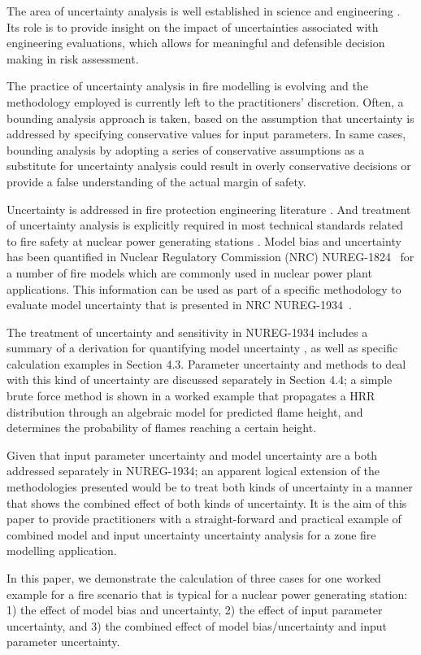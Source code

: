 
The area of uncertainty analysis is well established in science and engineering \cite{Morgan}.  Its role is to provide insight on the impact of uncertainties associated with engineering evaluations, which allows for meaningful and defensible decision making in risk assessment.

The practice of uncertainty analysis in fire modelling is evolving and the methodology employed is currently left to the practitioners' discretion. Often, a bounding analysis approach is taken, based on the assumption that uncertainty is addressed by specifying conservative values for input parameters. In same cases, bounding analysis by adopting a series of conservative assumptions as a substitute for uncertainty analysis could result in overly conservative decisions or provide a false understanding of the actual margin of safety. 

Uncertainty is addressed in fire protection engineering literature \cite{Notarianni:SFPE}.  And treatment of uncertainty analysis is explicitly required in most technical standards related to fire safety at nuclear power generating stations \cite{NFPA:805, NUREG:6850}.  Model bias and uncertainty has been quantified in Nuclear Regulatory Commission (NRC) NUREG-1824~\cite{NUREG_1824_Sup_1} for a number of fire models which are commonly used in nuclear power plant applications. This information can be used as part of a specific methodology to evaluate model uncertainty  that is presented in NRC NUREG-1934~\cite{NUREG_1934}. 

The treatment of  uncertainty and sensitivity in NUREG-1934 includes a summary of a derivation for quantifying model uncertainty \cite{McGrattan2011a}, as well as specific calculation examples in Section 4.3. Parameter uncertainty and methods to deal with this kind of uncertainty are discussed separately in Section 4.4; a simple brute force method is shown in  a worked example that propagates a HRR distribution through an algebraic model for predicted flame height, and determines the probability of flames reaching a certain height.

Given that input parameter uncertainty and model uncertainty are a both addressed separately in NUREG-1934; an apparent logical extension of the methodologies presented would be to treat both kinds of uncertainty in a manner that shows the combined effect of both kinds of uncertainty.  It is the aim of this paper to provide practitioners with a straight-forward and practical example of combined model and input uncertainty uncertainty analysis for a zone fire modelling application. 

In this paper, we demonstrate the calculation of three cases for one worked example for a fire scenario that is typical for a nuclear power generating station: 1) the effect of model bias and uncertainty, 2) the effect of input parameter uncertainty, and 3) the combined effect of model bias/uncertainty and input parameter uncertainty. 

